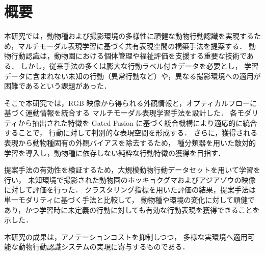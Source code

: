 \chapter{概要}
本研究では，動物種および撮影環境の多様性に頑健な動物行動認識を実現するため，マルチモーダル表現学習に基づく共有表現空間の構築手法を提案する．
動物行動認識は，動物園における個体管理や福祉評価を支援する重要な技術である．
しかし，従来手法の多くは膨大な行動ラベル付きデータを必要とし，
学習データに含まれない未知の行動（異常行動など）や，異なる撮影環境への適用が困難であるという課題があった．

そこで本研究では，RGB 映像から得られる外観情報と，オプティカルフローに基づく運動情報を統合する
マルチモーダル表現学習手法を設計した．
各モダリティから抽出された特徴を Gated Fusion に基づく統合機構により適応的に統合することで，
行動に対して判別的な表現空間を形成する．
さらに，獲得される表現から動物種固有の外観バイアスを除去するため，
種分類器を用いた敵対的学習を導入し，動物種に依存しない純粋な行動特徴の獲得を目指す．

提案手法の有効性を検証するため，大規模動物行動データセットを用いて学習を行い，
未知環境で撮影された動物園のホッキョクグマおよびアジアゾウの映像に対して評価を行った．
クラスタリング指標を用いた評価の結果，提案手法は単一モダリティに基づく手法と比較して，
動物種や環境の変化に対して頑健であり，かつ学習時に未定義の行動に対しても有効な行動表現を獲得できることを示した．

本研究の成果は，アノテーションコストを抑制しつつ，
多様な実環境へ適用可能な動物行動認識システムの実現に寄与するものである．